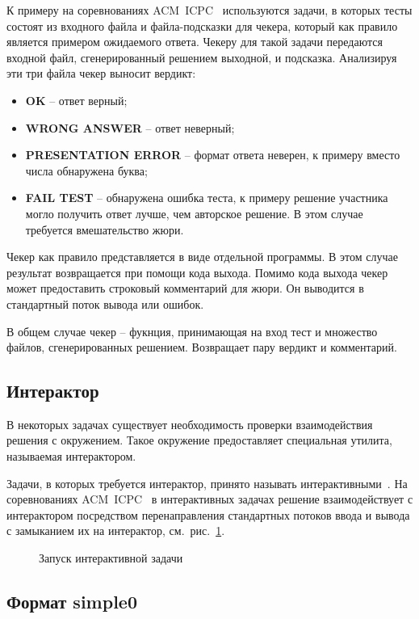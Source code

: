 К примеру на соревнованиях ACM~ICPC~\cite{acmicpc} используются задачи,
в которых тесты состоят из входного файла и файла-подсказки для чекера,
который как правило является примером ожидаемого ответа.
Чекеру для такой задачи передаются входной файл, сгенерированный решением выходной,
и подсказка. Анализируя эти три файла чекер выносит вердикт:
\begin{itemize}
    \item \textbf{OK} -- ответ верный;
    \item \textbf{WRONG ANSWER} -- ответ неверный;
    \item \textbf{PRESENTATION ERROR} -- формат ответа неверен,
        к примеру вместо числа обнаружена буква;
    \item \textbf{FAIL TEST} -- обнаружена ошибка теста,
        к примеру решение участника могло получить ответ лучше,
        чем авторское решение. В этом случае требуется
        вмешательство жюри.
\end{itemize}

Чекер как правило представляется в виде отдельной программы.
В этом случае результат возвращается при помощи кода выхода.
Помимо кода выхода чекер может предоставить строковый комментарий для жюри.
Он выводится в стандартный поток вывода или ошибок.

В общем случае чекер -- фукнция,
принимающая на вход тест и множество файлов, сгенерированных решением.
Возвращает пару вердикт и комментарий.

\subsection{Интерактор}
В некоторых задачах существует необходимость проверки взаимодействия решения с окружением.
Такое окружение предоставляет специальная утилита, называемая интерактором.

Задачи, в которых требуется интерактор, принято называть интерактивными~\cite{interactiveproblem}.
На соревнованиях ACM~ICPC~\cite{acmicpc} в интерактивных задачах
решение взаимодействует с интерактором посредством перенаправления
стандартных потоков ввода и вывода с замыканием их на интерактор, см.~рис.~\ref{fig:interactiverun}.

\begin{figure}
    \centering
    
    \caption{Запуск интерактивной задачи}
    \label{fig:interactiverun}
\end{figure}

\subsection{Формат simple0}
\label{simple0}

